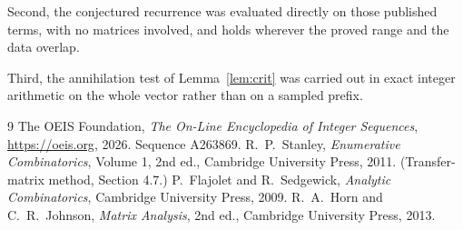 \documentclass[11pt,a4paper]{article}
\theoremstyle{plain}
\theoremstyle{definition}
\begin{document}
Second, the conjectured recurrence was evaluated directly on those published terms, with no
matrices involved, and holds wherever the proved range and the data overlap.

Third, the annihilation test of Lemma~\ref{lem:crit} was carried out in exact integer
arithmetic on the whole vector rather than on a sampled prefix.

\begin{thebibliography}{9}
 The OEIS Foundation, \emph{The On-Line Encyclopedia of Integer
Sequences}, \url{https://oeis.org}, 2026. Sequence A263869.
 R.~P.~Stanley, \emph{Enumerative Combinatorics}, Volume 1, 2nd ed.,
Cambridge University Press, 2011. (Transfer-matrix method, Section 4.7.)
 P.~Flajolet and R.~Sedgewick, \emph{Analytic Combinatorics}, Cambridge
University Press, 2009.
 R.~A.~Horn and C.~R.~Johnson, \emph{Matrix Analysis}, 2nd ed., Cambridge
University Press, 2013.
\end{thebibliography}
\end{document}
